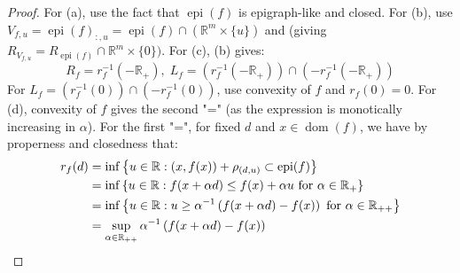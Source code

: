 \begin{proof}
	For (a), use the fact that $\operatorname{epi}(f)$ is epigraph-like and closed.	For (b), use $V_{f,u}=\operatorname{epi}(f)_{:,u}=\operatorname{epi}(f)\cap \left(\mathbb{R}^m\times \{u\}\right)$ and  (giving $R_{V_{f,u}}=R_{\operatorname{epi}(f)}\cap \mathbb{R}^m\times\{0\})$. For (c), (b) gives:
		\[
			R_f=r_f^{-1}\left(-\mathbb{R}_{+}\right),\;
			L_f=\left(r_f^{-1}\left(-\mathbb{R}_{+}\right)\right)\cap\left(-r_f^{-1}(-\mathbb{R}_{+})\right)
		\]
		For $L_f=\left(r_f^{-1}(0)\right)\cap\left(-r_f^{-1}(0)\right)$, use convexity of $f$ and $r_f(0)=0$. For (d), convexity of $f$ gives the second "=" (as the expression is monotically increasing in $\alpha $). For the first "=", for fixed $d$ and $x\in \operatorname{dom}(f)$, we have by properness and closedness that:
	\begin{align*}
		r_f(d) & =\inf \left\{u\in \mathbb{R}:(x,f(x))+\rho_{(d,u)}\subset \operatorname{epi}(f)\right\}                                       \\
		       & = \inf \left\{u\in \mathbb{R}:f(x+\alpha d)\leq f(x)+\alpha u\text{ for }\alpha \in \mathbb{R}_+\right\}                      \\
		       & = \inf \left\{u\in \mathbb{R}:u\geq \alpha^{-1}\left(f(x+\alpha d)- f(x)\right)\text{ for }\alpha \in \mathbb{R}_{++}\right\} \\
		       & = \sup_{\alpha \in \mathbb{R}_{++}} \alpha^{-1}\left(f(x+\alpha d)- f(x)\right)\qedhere{}
	\end{align*}
\end{proof}


